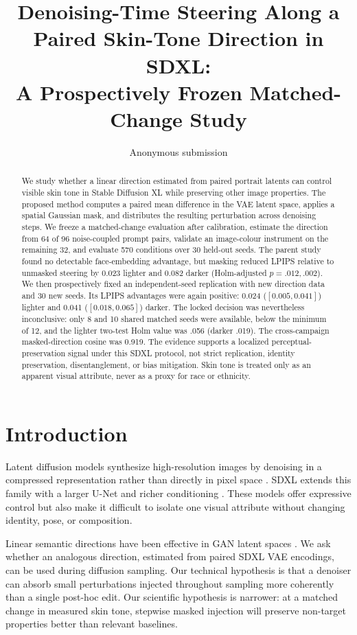 \documentclass[10pt,twocolumn]{article}
\title{Denoising-Time Steering Along a Paired Skin-Tone Direction in SDXL:\\
A Prospectively Frozen Matched-Change Study}
\author{Anonymous submission}
\date{}
\begin{document}
\maketitle

\begin{abstract}
We study whether a linear direction estimated from paired portrait latents can
control visible skin tone in Stable Diffusion XL while preserving other image
properties. The proposed method computes a paired mean difference in the VAE
latent space, applies a spatial Gaussian mask, and distributes the resulting
perturbation across denoising steps. We freeze a matched-change evaluation
after calibration, estimate the direction from 64 of 96 noise-coupled prompt
pairs, validate an image-colour instrument on the remaining 32, and evaluate
570 conditions over 30 held-out seeds. The parent study found no detectable
face-embedding advantage, but masking reduced LPIPS relative to unmasked
steering by 0.023 lighter and 0.082 darker (Holm-adjusted $p=.012,.002$).
We then prospectively fixed an independent-seed replication with new direction
data and 30 new seeds. Its LPIPS advantages were again positive: 0.024
($[0.005,0.041]$) lighter and 0.041 ($[0.018,0.065]$) darker. The locked
decision was nevertheless inconclusive: only 8 and 10 shared matched seeds
were available, below the minimum of 12, and the lighter two-test Holm value
was .056 (darker .019). The cross-campaign masked-direction cosine was 0.919.
The evidence supports a localized perceptual-preservation signal under this
SDXL protocol, not strict replication, identity preservation, disentanglement,
or bias mitigation. Skin tone is treated only as an apparent visual attribute,
never as a proxy for race or ethnicity.
\end{abstract}

\section{Introduction}

Latent diffusion models synthesize high-resolution images by denoising in a
compressed representation rather than directly in pixel space
\cite{rombach2022ldm}. SDXL extends this family with a larger U-Net and richer
conditioning \cite{podell2023sdxl}. These models offer expressive control but
also make it difficult to isolate one visual attribute without changing
identity, pose, or composition.

Linear semantic directions have been effective in GAN latent spaces
\cite{shen2020interfacegan}. We ask whether an analogous direction, estimated
from paired SDXL VAE encodings, can be used during diffusion sampling. Our
technical hypothesis is that a denoiser can absorb small perturbations injected
throughout sampling more coherently than a single post-hoc edit. Our scientific
hypothesis is narrower: at a matched change in measured skin tone, stepwise
masked injection will preserve non-target properties better than relevant
baselines.
\end{document}
